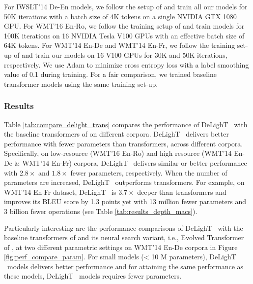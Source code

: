  For IWSLT'14 De-En models, we follow the setup of \cite{wu2018pay} and train all our models for 50K iterations with a batch size of 4K tokens on a single NVIDIA GTX 1080 GPU. For WMT'16 En-Ro, we follow the training setup of \cite{ghazvininejad2019mask} and train models for 100K iterations on 16 NVIDIA Tesla V100 GPUs with an effective batch size of 64K tokens. For WMT'14 En-De and WMT'14 En-Fr, we follow the training set-up of \cite{wu2018pay} and train our models on 16 V100 GPUs for 30K and 50K iterations, respectively. We use Adam \citep{kingma2014adam} to minimize cross entropy loss with a label smoothing value of 0.1 during training. For a fair comparison, we trained baseline transformer models using the same training set-up.


\subsubsection{Results}

 Table \ref{tab:compare_delight_trans} compares the performance of DeLighT ~with the baseline transformers of \citet{vaswani2017attention} on different corpora. DeLighT ~delivers better performance with fewer parameters than transformers, across different corpora. Specifically, on low-resource (WMT'16 En-Ro) and high resource (WMT'14 En-De \& WMT'14 En-Fr) corpora, DeLighT ~delivers similar or better performance with $2.8\times$ and $1.8\times$ fewer parameters, respectively. When the number of parameters are increased, DeLighT ~outperforms transformers. For example, on WMT'14 En-Fr dataset, DeLighT ~is $3.7\times$ deeper than transformers and improves its BLEU score by 1.3 points yet with 13 million fewer parameters and 3 billion fewer operations (see Table \ref{tab:results_depth_macs}).

Particularly interesting are the performance comparisons of DeLighT ~with the baseline transformers of \citet{vaswani2017attention} and its neural search variant, i.e., Evolved Transformer of \citet{so2019evolved}, at two different parametric settings on WMT'14 En-De corpora in Figure \ref{fig:perf_compare_param}. For small models (< 10 M parameters), DeLighT ~models delivers better performance and for attaining the same performance as these models, DeLighT ~models requires fewer parameters. 

